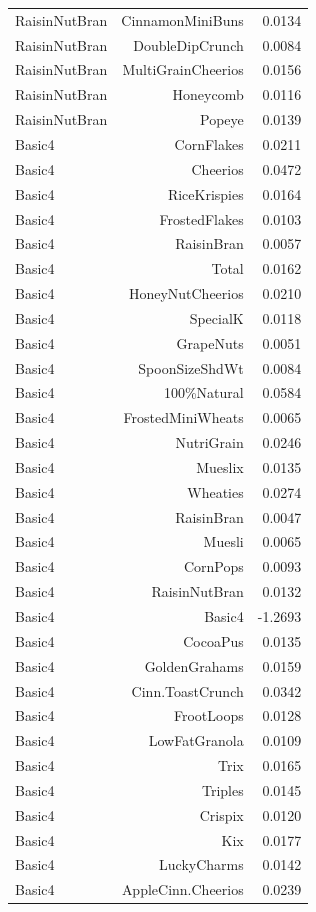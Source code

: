 \begin{longtable}{@{}lrr@{}}
RaisinNutBran & CinnamonMiniBuns & 0.0134 \\
RaisinNutBran & DoubleDipCrunch & 0.0084 \\
RaisinNutBran & MultiGrainCheerios & 0.0156 \\
RaisinNutBran & Honeycomb & 0.0116 \\
RaisinNutBran & Popeye & 0.0139 \\
Basic4 & CornFlakes & 0.0211 \\
Basic4 & Cheerios & 0.0472 \\
Basic4 & RiceKrispies & 0.0164 \\
Basic4 & FrostedFlakes & 0.0103 \\
Basic4 & RaisinBran & 0.0057 \\
Basic4 & Total & 0.0162 \\
Basic4 & HoneyNutCheerios & 0.0210 \\
Basic4 & SpecialK & 0.0118 \\
Basic4 & GrapeNuts & 0.0051 \\
Basic4 & SpoonSizeShdWt & 0.0084 \\
Basic4 & 100\%Natural & 0.0584 \\
Basic4 & FrostedMiniWheats & 0.0065 \\
Basic4 & NutriGrain & 0.0246 \\
Basic4 & Mueslix & 0.0135 \\
Basic4 & Wheaties & 0.0274 \\
Basic4 & RaisinBran & 0.0047 \\
Basic4 & Muesli & 0.0065 \\
Basic4 & CornPops & 0.0093 \\
Basic4 & RaisinNutBran & 0.0132 \\
Basic4 & Basic4 & -1.2693 \\
Basic4 & CocoaPus & 0.0135 \\
Basic4 & GoldenGrahams & 0.0159 \\
Basic4 & Cinn.ToastCrunch & 0.0342 \\
Basic4 & FrootLoops & 0.0128 \\
Basic4 & LowFatGranola & 0.0109 \\
Basic4 & Trix & 0.0165 \\
Basic4 & Triples & 0.0145 \\
Basic4 & Crispix & 0.0120 \\
Basic4 & Kix & 0.0177 \\
Basic4 & LuckyCharms & 0.0142 \\
Basic4 & AppleCinn.Cheerios & 0.0239 \\

\end{longtable}
